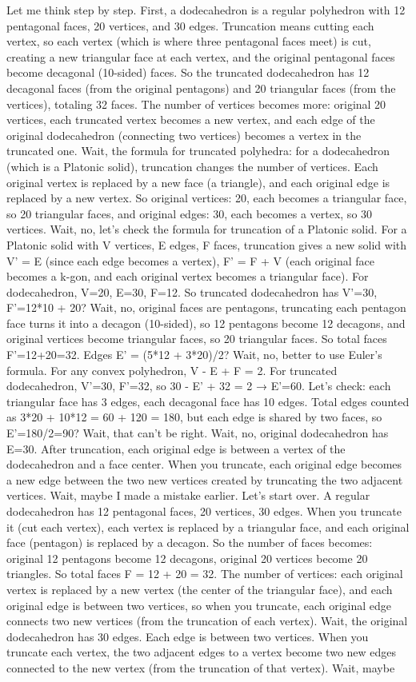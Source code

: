 Let me think step by step. First, a dodecahedron is a regular polyhedron with 12 pentagonal faces, 20 vertices, and 30 edges. Truncation means cutting each vertex, so each vertex (which is where three pentagonal faces meet) is cut, creating a new triangular face at each vertex, and the original pentagonal faces become decagonal (10-sided) faces. So the truncated dodecahedron has 12 decagonal faces (from the original pentagons) and 20 triangular faces (from the vertices), totaling 32 faces. The number of vertices becomes more: original 20 vertices, each truncated vertex becomes a new vertex, and each edge of the original dodecahedron (connecting two vertices) becomes a vertex in the truncated one. Wait, the formula for truncated polyhedra: for a dodecahedron (which is a Platonic solid), truncation changes the number of vertices. Each original vertex is replaced by a new face (a triangle), and each original edge is replaced by a new vertex. So original vertices: 20, each becomes a triangular face, so 20 triangular faces, and original edges: 30, each becomes a vertex, so 30 vertices. Wait, no, let's check the formula for truncation of a Platonic solid. For a Platonic solid with V vertices, E edges, F faces, truncation gives a new solid with V' = E (since each edge becomes a vertex), F' = F + V (each original face becomes a k-gon, and each original vertex becomes a triangular face). For dodecahedron, V=20, E=30, F=12. So truncated dodecahedron has V'=30, F'=12*10 + 20? Wait, no, original faces are pentagons, truncating each pentagon face turns it into a decagon (10-sided), so 12 pentagons become 12 decagons, and original vertices become triangular faces, so 20 triangular faces. So total faces F'=12+20=32. Edges E' = (5*12 + 3*20)/2? Wait, no, better to use Euler's formula. For any convex polyhedron, V - E + F = 2. For truncated dodecahedron, V'=30, F'=32, so 30 - E' + 32 = 2 → E'=60. Let's check: each triangular face has 3 edges, each decagonal face has 10 edges. Total edges counted as 3*20 + 10*12 = 60 + 120 = 180, but each edge is shared by two faces, so E'=180/2=90? Wait, that can't be right. Wait, no, original dodecahedron has E=30. After truncation, each original edge is between a vertex of the dodecahedron and a face center. When you truncate, each original edge becomes a new edge between the two new vertices created by truncating the two adjacent vertices. Wait, maybe I made a mistake earlier. Let's start over. A regular dodecahedron has 12 pentagonal faces, 20 vertices, 30 edges. When you truncate it (cut each vertex), each vertex is replaced by a triangular face, and each original face (pentagon) is replaced by a decagon. So the number of faces becomes: original 12 pentagons become 12 decagons, original 20 vertices become 20 triangles. So total faces F = 12 + 20 = 32. The number of vertices: each original vertex is replaced by a new vertex (the center of the triangular face), and each original edge is between two vertices, so when you truncate, each original edge connects two new vertices (from the truncation of each vertex). Wait, the original dodecahedron has 30 edges. Each edge is between two vertices. When you truncate each vertex, the two adjacent edges to a vertex become two new edges connected to the new vertex (from the truncation of that vertex). Wait, maybe 